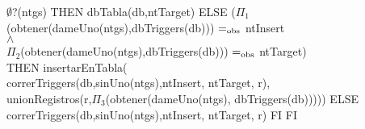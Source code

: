 \begin{tad}{}
    {\IF $\emptyset$?(ntgs)
      THEN  dbTabla(db,ntTarget)
      ELSE {\IF($\Pi_1$(obtener(dameUno(ntgs),dbTriggers(db))) $=_{\mathrm{obs}}$ ntInsert
              \\ \hspace*{\itefIndentacion}
                $\land$
              \\ \hspace*{\itefIndentacion}
                $\Pi_2$(obtener(dameUno(ntgs),dbTriggers(db))) $=_{\mathrm{obs}}$ ntTarget)
              \\ THEN 
                insertarEnTabla(
              \\ \hspace*{\itefIndentacion}
                 correrTriggers(db,sinUno(ntgs),ntInsert, ntTarget, r),
              \\ \hspace*{\itefIndentacion}
                 unionRegistros(r,$\Pi_3$(obtener(dameUno(ntgs), dbTriggers(db)))))
            ELSE correrTriggers(db,sinUno(ntgs),ntInsert, ntTarget, r)
           FI}
      FI}

\end{tad}

